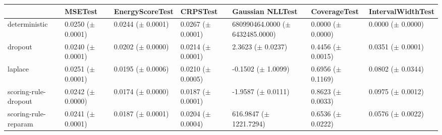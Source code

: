 \begin{tabular}{lllllll}
\toprule
 & MSETest & EnergyScoreTest & CRPSTest & Gaussian NLLTest & CoverageTest & IntervalWidthTest \\
\midrule
deterministic & \makecell{0.0250 \\ ($\pm$ 0.0001)} & \makecell{0.0244 \\ ($\pm$ 0.0001)} & \makecell{0.0267 \\ ($\pm$ 0.0001)} & \makecell{680990464.0000 \\ ($\pm$ 6432485.0000)} & \makecell{0.0000 \\ ($\pm$ 0.0000)} & \makecell{0.0000 \\ ($\pm$ 0.0000)} \\
dropout & \makecell{0.0240 \\ ($\pm$ 0.0001)} & \makecell{0.0202 \\ ($\pm$ 0.0000)} & \makecell{0.0214 \\ ($\pm$ 0.0001)} & \makecell{2.3623 \\ ($\pm$ 0.0237)} & \makecell{0.4456 \\ ($\pm$ 0.0015)} & \makecell{0.0351 \\ ($\pm$ 0.0001)} \\
laplace & \makecell{0.0251 \\ ($\pm$ 0.0001)} & \makecell{0.0195 \\ ($\pm$ 0.0006)} & \makecell{0.0210 \\ ($\pm$ 0.0005)} & \makecell{-0.1502 \\ ($\pm$ 1.0099)} & \makecell{0.6956 \\ ($\pm$ 0.1169)} & \makecell{0.0802 \\ ($\pm$ 0.0344)} \\
scoring-rule-dropout & \makecell{0.0242 \\ ($\pm$ 0.0000)} & \makecell{0.0174 \\ ($\pm$ 0.0000)} & \makecell{0.0187 \\ ($\pm$ 0.0001)} & \makecell{-1.9587 \\ ($\pm$ 0.0111)} & \makecell{0.8623 \\ ($\pm$ 0.0033)} & \makecell{0.0975 \\ ($\pm$ 0.0012)} \\
scoring-rule-reparam & \makecell{0.0241 \\ ($\pm$ 0.0001)} & \makecell{0.0187 \\ ($\pm$ 0.0001)} & \makecell{0.0204 \\ ($\pm$ 0.0004)} & \makecell{616.9847 \\ ($\pm$ 1221.7294)} & \makecell{0.6536 \\ ($\pm$ 0.0222)} & \makecell{0.0576 \\ ($\pm$ 0.0022)} \\
\bottomrule
\end{tabular}
